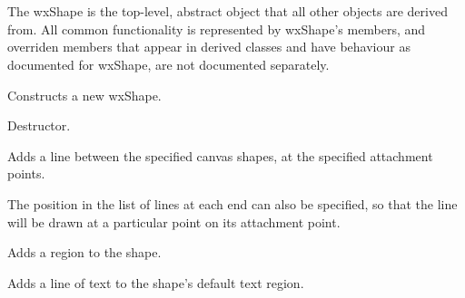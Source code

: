 \section{}\label{wxshape}

The wxShape is the top-level, abstract object that all other
objects are derived from. All common functionality is represented by
wxShape's members, and overriden members that appear in derived
classes and have behaviour as documented for wxShape, are not
documented separately.






Constructs a new wxShape.



Destructor.



Adds a line between the specified canvas shapes, at the specified attachment points.

The position in the list of lines at each end can also be specified, so that the line will be drawn
at a particular point on its attachment point.



Adds a region to the shape.



Adds a line of text to the shape's default text region.




